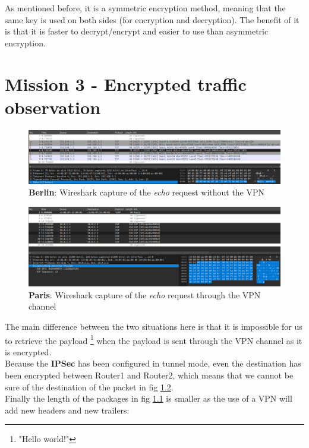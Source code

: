 \documentclass[10pt,a4paper]{ULBreport}
\begin{document}


As mentioned before, it is a symmetric encryption method, meaning that the same key is used on both sides (for encryption and decryption). The benefit of it is that it is faster to decrypt/encrypt and easier to use than asymmetric encryption.

\chapter{Mission 3 - Encrypted traffic observation}





\begin{figure}[H]
    \centering
    \includegraphics[width=\textwidth]{Images/wireshark2.png}
    \caption{\textbf{Berlin}: Wireshark capture of the \textit{echo} request without the VPN}
    \label{img:wireshark_2_1}
\end{figure}

\begin{figure}[H]
    \centering
    \includegraphics[width=\textwidth]{Images/wireshark1.png}
    \caption{\textbf{Paris}: Wireshark capture of the \textit{echo} request through the VPN channel}
    \label{img:wireshark_2_2}
\end{figure}

The main difference between the two situations here is that it is impossible for us
to retrieve the payload \footnote{"Hello world!"} when the payload is sent through the
VPN channel as it is encrypted. \\
Because the \textbf{IPSec} has been configured in tunnel
mode, even the destination has been encrypted between Router1 and Router2, which means
that we cannot be sure of the destination of the packet in fig \ref{img:wireshark_2_2}. \\
Finally the length of the packages in fig \ref{img:wireshark_2_1} is smaller as the use
of a VPN will add new headers and new trailers:
\end{document}
